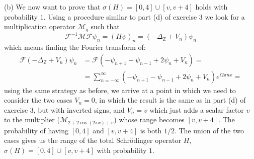 \documentclass{article}
\newcommand{\F}{\mathcal{F}}
\newcommand{\f}{\mathcal{F}^{-1}}
\newcommand{\Z}{\mathbb{Z}}
\begin{document}
(b) We now want to prove that $\sigma(H) = [0,4] \cup [v, v+4]$ holds with probability $1$. Using a procedure similar to part (d) of exercise 3 we look for a multiplication operator $\mathcal{M}_g$ such that
\[
    \f \mathcal{M} \F \psi_n = {(H \psi)}_n = (-\Delta_\Z + V_n)\psi_n
\]
which means finding the Fourier transform of:
\[
    \begin{split}
        \F (-\Delta_\Z + V_n) \psi_n &= \F ( -\psi_{n+1} - \psi_{n-1} + 2 \psi_n + V_n) = \\
        &= \sum_{n= -\infty}^\infty (- \psi_{n+1} - \psi_{n-1} +2 \psi_n + V_n) e^{i2\pi n x} = 
    \end{split}
\]
using the same strategy as before, we arrive at a point in which we need to consider the two cases $V_n = 0$, in which the result is the same as in part (d) of exercise 3, but with inverted signs, and $V_n = v$ which just adds a scalar factor $v$ to the multiplier ($\mathcal{M}_{2+ 2\cos{(2\pi x)} +v}$) whose range becomes $[v, v+4]$. The probability of having $[0,4]$ and $[v, v+4]$ is both $1 / 2$. The union of the two cases gives us the range of the total Schrödinger operator $H$, $\sigma(H) = [0,4] \cup [v, v+4]$ with probability $1$.
\end{document}
